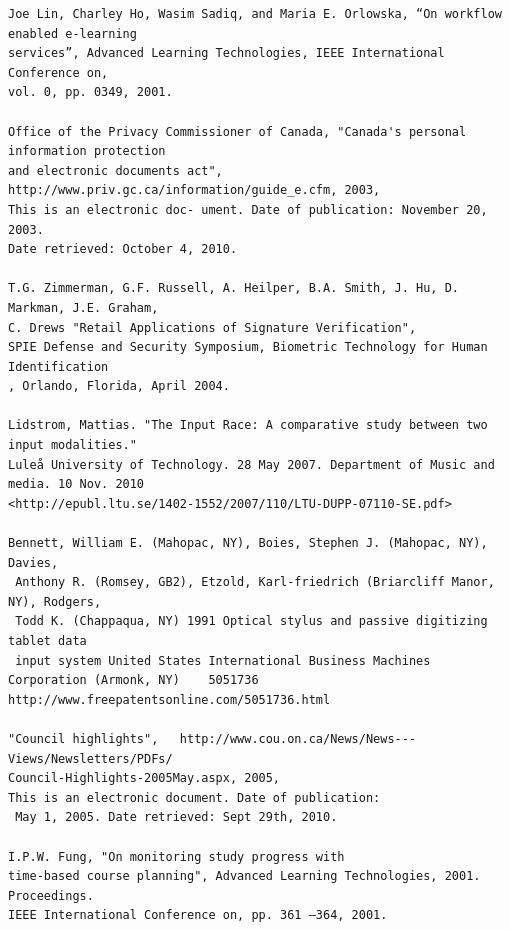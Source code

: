 \documentclass[11pt,a4paper]{report}
\begin{document}
\begin{verbatim}
Joe Lin, Charley Ho, Wasim Sadiq, and Maria E. Orlowska, “On workflow enabled e-learning 
services”, Advanced Learning Technologies, IEEE International Conference on,
vol. 0, pp. 0349, 2001.

Office of the Privacy Commissioner of Canada, "Canada's personal information protection 
and electronic documents act", http://www.priv.gc.ca/information/guide_e.cfm, 2003, 
This is an electronic doc- ument. Date of publication: November 20, 2003. 
Date retrieved: October 4, 2010.

T.G. Zimmerman, G.F. Russell, A. Heilper, B.A. Smith, J. Hu, D. Markman, J.E. Graham, 
C. Drews "Retail Applications of Signature Verification",
SPIE Defense and Security Symposium, Biometric Technology for Human Identification
, Orlando, Florida, April 2004.

Lidstrom, Mattias. "The Input Race: A comparative study between two input modalities." 
Luleå University of Technology. 28 May 2007. Department of Music and media. 10 Nov. 2010 
<http://epubl.ltu.se/1402-1552/2007/110/LTU-DUPP-07110-SE.pdf>

Bennett, William E. (Mahopac, NY), Boies, Stephen J. (Mahopac, NY), Davies,
 Anthony R. (Romsey, GB2), Etzold, Karl-friedrich (Briarcliff Manor, NY), Rodgers, 
 Todd K. (Chappaqua, NY) 1991 Optical stylus and passive digitizing tablet data 
 input system United States International Business Machines Corporation (Armonk, NY)	5051736 http://www.freepatentsonline.com/5051736.html

"Council highlights",	http://www.cou.on.ca/News/News---Views/Newsletters/PDFs/ 
Council-Highlights-2005May.aspx, 2005, 
This is an electronic document. Date of publication:
 May 1, 2005. Date retrieved: Sept 29th, 2010.

I.P.W. Fung, "On monitoring study progress with 
time-based course planning", Advanced Learning Technologies, 2001. Proceedings. 
IEEE International Conference on, pp. 361 –364, 2001.
\end{verbatim}


\clearpage
\newpage 

\listoffigures

\clearpage
\newpage 

\printindex
\end{document}
